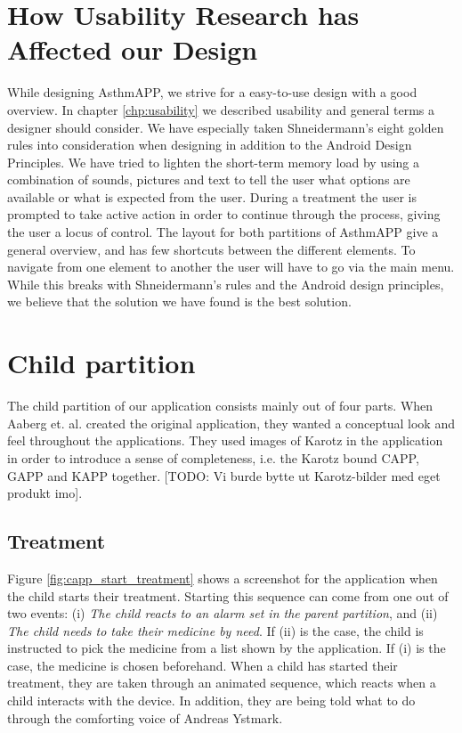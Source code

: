 \section{How Usability Research has Affected our Design}
\label{sec:usability-affect-design}
While designing AsthmAPP, we strive for a easy-to-use design with a good overview. In chapter \ref{chp:usability} we described usability and general terms a designer should consider. We have especially taken Shneidermann's eight golden rules into consideration when designing\cite{shneiderman2003designing} in addition to the Android Design Principles\cite{androiddesign}. 
We have tried to lighten the short-term memory load by using a combination of sounds, pictures and text to tell the user what options are available or what is expected from the user. During a treatment the user is prompted to take active action in order to continue through the process, giving the user a locus of control. 
The layout for both partitions of AsthmAPP give a general overview, and has few shortcuts between the different elements. To navigate from one element to another the user will have to go via the main menu. While this breaks with Shneidermann's rules and the Android design principles, we believe that the solution we have found is the best solution.


\section{Child partition}
\label{sec:description-child-partition}
The child partition of our application consists mainly out of four parts. When Aaberg et. al. created the original application, they wanted a conceptual look and feel throughout the applications. They used images of Karotz in the application in order to introduce a sense of completeness, i.e. the Karotz bound CAPP, GAPP and KAPP together. [TODO: Vi burde bytte ut Karotz-bilder med eget produkt imo]. 

\subsection{Treatment}
\label{sec:sec:description-treatment}
Figure \ref{fig:capp_start_treatment} shows a screenshot for the application when the child starts their treatment. Starting this sequence can come from one out of two events: (i) \emph{The child reacts to an alarm set in the parent partition}, and (ii) \emph{The child needs to take their medicine by need}. If (ii) is the case, the child is instructed to pick the medicine from a list shown by the application. If (i) is the case, the medicine is chosen beforehand. When a child has started their treatment, they are taken through an animated sequence, which reacts when a child interacts with the device. In addition, they are being told what to do through the comforting voice of Andreas Ystmark.  


